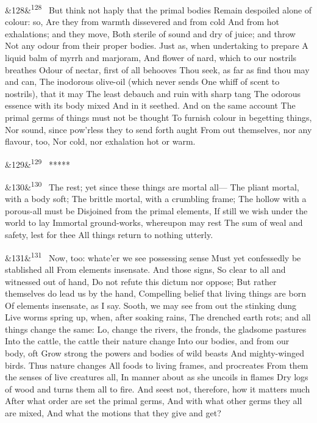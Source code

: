 \documentclass[12pt]{article}
\newcommand{\para}[1][]{\par\noindent\ifx&#1&\else\textsuperscript{\footnotesize #1}~\fi}
\begin{document}
\para[128] But think not haply that the primal bodies Remain despoiled alone of colour: so, Are they from warmth dissevered and from cold And from hot exhalations; and they move, Both sterile of sound and dry of juice; and throw Not any odour from their proper bodies. Just as, when undertaking to prepare A liquid balm of myrrh and marjoram, And flower of nard, which to our nostrils breathes Odour of nectar, first of all behooves Thou seek, as far as find thou may and can, The inodorous olive-oil (which never sends One whiff of scent to nostrils), that it may The least debauch and ruin with sharp tang The odorous essence with its body mixed And in it seethed. And on the same account The primal germs of things must not be thought To furnish colour in begetting things, Nor sound, since pow'rless they to send forth aught From out themselves, nor any flavour, too, Nor cold, nor exhalation hot or warm.

\para[129] *****

\para[130] The rest; yet since these things are mortal all--- The pliant mortal, with a body soft; The brittle mortal, with a crumbling frame; The hollow with a porous-all must be Disjoined from the primal elements, If still we wish under the world to lay Immortal ground-works, whereupon may rest The sum of weal and safety, lest for thee All things return to nothing utterly.

\para[131] Now, too: whate'er we see possessing sense Must yet confessedly be stablished all From elements insensate. And those signs, So clear to all and witnessed out of hand, Do not refute this dictum nor oppose; But rather themselves do lead us by the hand, Compelling belief that living things are born Of elements insensate, as I say. Sooth, we may see from out the stinking dung Live worms spring up, when, after soaking rains, The drenched earth rots; and all things change the same: Lo, change the rivers, the fronds, the gladsome pastures Into the cattle, the cattle their nature change Into our bodies, and from our body, oft Grow strong the powers and bodies of wild beasts And mighty-winged birds. Thus nature changes All foods to living frames, and procreates From them the senses of live creatures all, In manner about as she uncoils in flames Dry logs of wood and turns them all to fire. And seest not, therefore, how it matters much After what order are set the primal germs, And with what other germs they all are mixed, And what the motions that they give and get?
\end{document}
